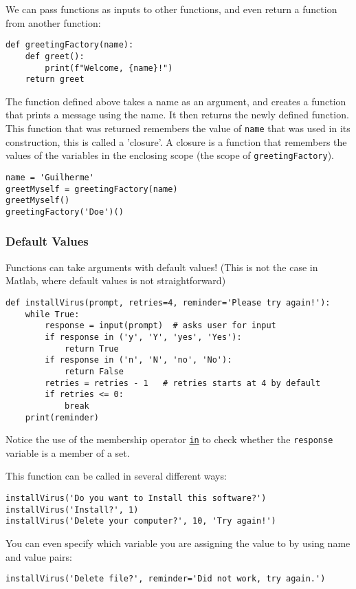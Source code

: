 \documentclass[12pt, a4paper]{article}
\begin{document}
We can pass functions as inputs to other functions, and even return a function from another function:
\lstset{language=jupyter-python,label= ,caption= ,captionpos=b,numbers=none}
\begin{lstlisting}
def greetingFactory(name):
    def greet():
        print(f"Welcome, {name}!")
    return greet
\end{lstlisting}

The function defined above takes a name as an argument, and creates a function that prints a message using the name.
It then returns the newly defined function.
This function that was returned remembers the value of \texttt{name} that was used in its construction, this is called a 'closure'.
A closure is a function that remembers the values of the variables in the enclosing scope (the scope of \texttt{greetingFactory}).
\lstset{language=jupyter-python,label= ,caption= ,captionpos=b,numbers=none}
\begin{lstlisting}
name = 'Guilherme'
greetMyself = greetingFactory(name)
greetMyself()
greetingFactory('Doe')()
\end{lstlisting}
\subsubsection{Default Values}
\label{sec:org40c3c7b}
Functions can take arguments with default values! (This is not the case in Matlab, where default values is not straightforward)
\lstset{language=jupyter-python,label= ,caption= ,captionpos=b,numbers=none}
\begin{lstlisting}
def installVirus(prompt, retries=4, reminder='Please try again!'):
    while True:
        response = input(prompt)  # asks user for input
        if response in ('y', 'Y', 'yes', 'Yes'):
            return True
        if response in ('n', 'N', 'no', 'No'):
            return False
        retries = retries - 1   # retries starts at 4 by default
        if retries <= 0:
            break
    print(reminder)
\end{lstlisting}
Notice the use of the membership operator \href{https://docs.python.org/3.6/reference/expressions.html\#membership-test-operations}{\texttt{in}} to check whether the \texttt{response} variable is a member of a set.

This function can be called in several different ways:
\lstset{language=jupyter-python,label= ,caption= ,captionpos=b,numbers=none}
\begin{lstlisting}
installVirus('Do you want to Install this software?')
installVirus('Install?', 1)
installVirus('Delete your computer?', 10, 'Try again!')
\end{lstlisting}
You can even specify which variable you are assigning the value to by using name and value pairs:
\lstset{language=jupyter-python,label= ,caption= ,captionpos=b,numbers=none}
\begin{lstlisting}
installVirus('Delete file?', reminder='Did not work, try again.')
\end{lstlisting}
\end{document}
